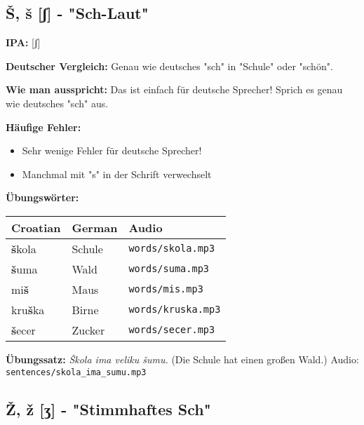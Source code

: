 \subsection{Š, š [ʃ] - "Sch-Laut"}

\begin{tcolorbox}[breakable, colback=lightblue!30, colframe=croatianblue, title=\textbf{Š, š}]

\textbf{IPA:} [ʃ]

\textbf{Deutscher Vergleich:}
Genau wie deutsches "sch" in "Schule" oder "schön".

\textbf{Wie man ausspricht:}
Das ist einfach für deutsche Sprecher! Sprich es genau wie deutsches "sch" aus.

\textbf{Häufige Fehler:}
\begin{itemize}
    \item Sehr wenige Fehler für deutsche Sprecher!
    \item Manchmal mit "s" in der Schrift verwechselt
\end{itemize}

\textbf{Übungswörter:}
\begin{center}
\small
\begin{tabular}{lll}
\textbf{Croatian} & \textbf{German} & \textbf{Audio} \\
\midrule
\textbf{š}kola & Schule & \small\texttt{words/skola.mp3} \\
\textbf{š}uma & Wald & \small\texttt{words/suma.mp3} \\
mi\textbf{š} & Maus & \small\texttt{words/mis.mp3} \\
kru\textbf{š}ka & Birne & \small\texttt{words/kruska.mp3} \\
\textbf{š}ecer & Zucker & \small\texttt{words/secer.mp3} \\
\end{tabular}
\end{center}

\textbf{Übungssatz:}
\textit{Škola ima veliku šumu.}
(Die Schule hat einen großen Wald.)
Audio: \small\texttt{sentences/skola\_ima\_sumu.mp3}

\end{tcolorbox}

\subsection{Ž, ž [ʒ] - "Stimmhaftes Sch"}

